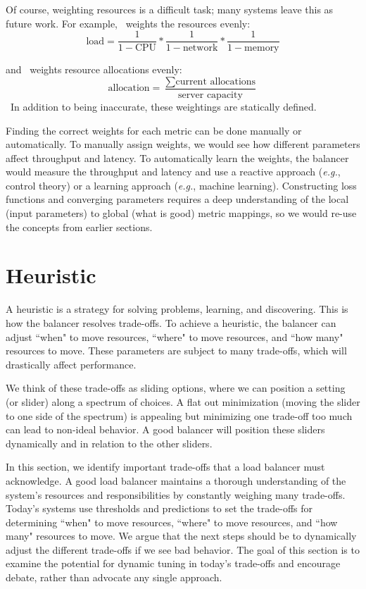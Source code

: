 Of course, weighting resources is a difficult task; many systems leave this as future work. For example,~\cite{wood:nsdi07-sandpiper} weights the resources evenly: \[\text{load} = \frac{1}{1 - \text{CPU}} * \frac{1}{1 - \text{network}} * \frac{1}{1 - \text{memory}}\]

\noindent and~\cite{vmware-drs,gulati:hotcloud2011-cloud-resource-management} weights resource allocations evenly:
\[\text{allocation} = \frac{\sum \text{current allocations}}{\text{server capacity}}\]\
\noindent In addition to being inaccurate, these weightings are statically defined. 

Finding the correct weights for each metric can be done manually or automatically. To manually assign weights, we would see how different parameters affect throughput and latency. To automatically learn the weights, the balancer would measure the throughput and latency and use a reactive approach ({\it e.g.}, control theory) or a learning approach ({\it e.g.}, machine learning). Constructing loss functions and converging parameters requires a deep understanding of the local (input parameters) to global (what is good) metric mappings, so we would re-use the concepts from earlier sections.

\section{Heuristic}
	
A heuristic is a strategy for solving problems, learning, and discovering. This is how the balancer resolves trade-offs. To achieve a heuristic, the balancer can adjust ``when" to move resources, ``where" to move resources, and ``how many" resources to move. These parameters are subject to many trade-offs, which will drastically affect performance. 

We think of these trade-offs as sliding options, where we can position a setting (or slider) along a spectrum of choices. A flat out minimization (moving the slider to one side of the spectrum) is appealing but minimizing one trade-off too much can lead to non-ideal behavior. A good balancer will position these sliders dynamically and in relation to the other sliders.

In this section, we identify important trade-offs that a load balancer must acknowledge. A good load balancer maintains a thorough understanding of the system's resources and responsibilities by constantly weighing many trade-offs. Today's systems use thresholds and predictions to set the trade-offs for determining ``when" to move resources, ``where" to move resources, and ``how many" resources to move. We argue that the next steps should be to dynamically adjust the different trade-offs if we see bad behavior. The goal of this section is to examine the potential for dynamic tuning in today's trade-offs and encourage debate, rather than advocate any single approach. 

